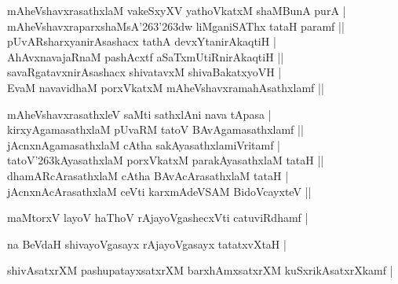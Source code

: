 \begin{entry}
\begin{shl}
\end{shl}
\medskip
{}
\medskip
\begin{shl}
mAheVshavxrasathxlaM vakeSxyXV yathoVkatxM shaMBunA purA |\\[2pt]
mAheVshavxraparxshaMsA{\char'263\char'263}dw liMganiSAThx tataH paramf ||\\[2pt]
pUvARsharxyanirAsashacx tathA devxYtanirAkaqtiH |\\[2pt]
AhAvxnavajaRnaM pashAcxtf aSaTxmUtiRnirAkaqtiH ||\\[2pt]
savaRgatavxnirAsashacx shivatavxM shivaBakatxyoVH |\\[2pt]
EvaM navavidhaM porxVkatxM mAheVshavxramahAsathxlamf ||\\[-1pt]
\end{shl}
\medskip
{}
\medskip
\begin{shl}
mAheVshavxrasathxleV saMti sathxlAni nava tApasa |\\[2pt]
kirxyAgamasathxlaM pUvaRM tatoV BAvAgamasathxlamf ||\\[2pt]
jAcnxnAgamasathxlaM cAtha sakAyasathxlamiVritamf |\\[2pt]
tatoV{\char'263}kAyasathxlaM porxVkatxM parakAyasathxlaM tataH ||\\[2pt]
dhamARcArasathxlaM cAtha BAvAcArasathxlaM tataH |\\[2pt]
jAcnxnAcArasathxlaM ceVti karxmAdeVSAM BidoVcayxteV ||\\[-1pt]
\end{shl}
\medskip
{}
\medskip
{}
\medskip
\begin{shl}
maMtorxV layoV haThoV rAjayoVgashecxVti catuviRdhamf |\\[-1pt]
\end{shl}
\medskip
{}
\medskip
{}
\medskip
\begin{shl}
na BeVdaH shivayoVgasayx rAjayoVgasayx tatatxvXtaH |\\[-1pt]
\end{shl}
\medskip
{}
\medskip
{}
\medskip
\begin{shl}
shivAsatxrXM pashupatayxsatxrXM barxhAmxsatxrXM kuSxrikAsatxrXkamf |\\[2pt]

\end{shl}
\end{entry}
